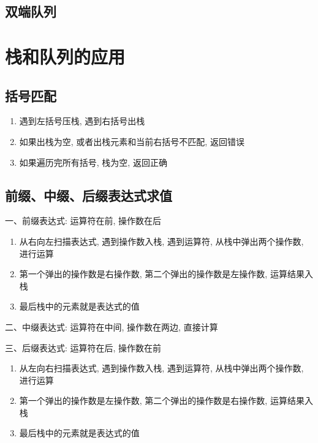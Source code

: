 \subsection{双端队列}
\section{栈和队列的应用}
\subsection{括号匹配}
\begin{theorem}[算法步骤]
    \begin{enumerate}
        \item 遇到左括号压栈, 遇到右括号出栈
        \item 如果出栈为空, 或者出栈元素和当前右括号不匹配, 返回错误
        \item 如果遍历完所有括号, 栈为空, 返回正确
    \end{enumerate}
\end{theorem}
\subsection{前缀、中缀、后缀表达式求值}
\begin{theorem}[表达式求值]
    一、前缀表达式: 运算符在前, 操作数在后
    \begin{enumerate}
        \item 从右向左扫描表达式, 遇到操作数入栈, 遇到运算符, 从栈中弹出两个操作数, 进行运算
        \item 第一个弹出的操作数是右操作数, 第二个弹出的操作数是左操作数, 运算结果入栈
        \item 最后栈中的元素就是表达式的值
    \end{enumerate}

    二、中缀表达式: 运算符在中间, 操作数在两边, 直接计算

    三、后缀表达式: 运算符在后, 操作数在前
    \begin{enumerate}
        \item 从左向右扫描表达式, 遇到操作数入栈, 遇到运算符, 从栈中弹出两个操作数, 进行运算
        \item 第一个弹出的操作数是左操作数, 第二个弹出的操作数是右操作数, 运算结果入栈
        \item 最后栈中的元素就是表达式的值
    \end{enumerate}
\end{theorem}

